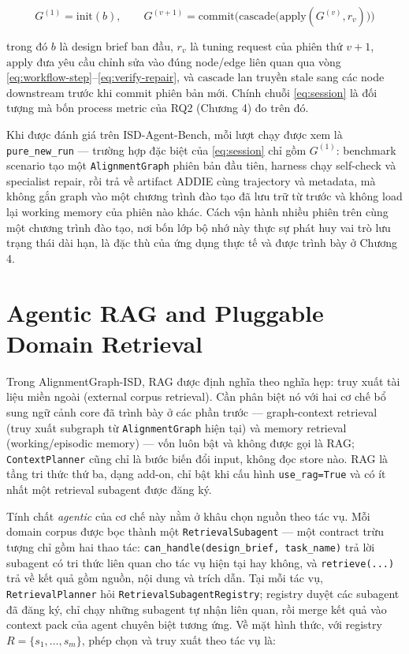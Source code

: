 \documentclass[../main.tex]{subfiles}
\begin{document}
\begin{equation}\label{eq:session}
G^{(1)} = \mathrm{init}(b), \qquad G^{(v+1)} = \mathrm{commit}\Big(\mathrm{cascade}\big(\mathrm{apply}(G^{(v)}, r_v)\big)\Big)
\end{equation}

trong đó $b$ là design brief ban đầu, $r_v$ là tuning request của phiên thứ $v{+}1$, $\mathrm{apply}$ đưa yêu cầu chỉnh sửa vào đúng node/edge liên quan qua vòng \eqref{eq:workflow-step}--\eqref{eq:verify-repair}, và $\mathrm{cascade}$ lan truyền stale sang các node downstream trước khi commit phiên bản mới. Chính chuỗi \eqref{eq:session} là đối tượng mà bốn process metric của RQ2 (Chương 4) đo trên đó.

Khi được đánh giá trên ISD-Agent-Bench, mỗi lượt chạy được xem là \texttt{pure\_new\_run} — trường hợp đặc biệt của \eqref{eq:session} chỉ gồm $G^{(1)}$: benchmark scenario tạo một \texttt{AlignmentGraph} phiên bản đầu tiên, harness chạy self-check và specialist repair, rồi trả về artifact ADDIE cùng trajectory và metadata, mà không gắn graph vào một chương trình đào tạo đã lưu trữ từ trước và không load lại working memory của phiên nào khác. Cách vận hành nhiều phiên trên cùng một chương trình đào tạo, nơi bốn lớp bộ nhớ này thực sự phát huy vai trò lưu trạng thái dài hạn, là đặc thù của ứng dụng thực tế và được trình bày ở Chương 4.

\section{Agentic RAG and Pluggable Domain Retrieval}\label{sec:agentic-rag}

Trong AlignmentGraph-ISD, RAG được định nghĩa theo nghĩa hẹp: truy xuất tài liệu miền ngoài (external corpus retrieval). Cần phân biệt nó với hai cơ chế bổ sung ngữ cảnh core đã trình bày ở các phần trước — graph-context retrieval (truy xuất subgraph từ \texttt{AlignmentGraph} hiện tại) và memory retrieval (working/episodic memory) — vốn luôn bật và không được gọi là RAG; \texttt{ContextPlanner} cũng chỉ là bước biến đổi input, không đọc store nào. RAG là tầng tri thức thứ ba, dạng add-on, chỉ bật khi cấu hình \texttt{use\_rag=True} và có ít nhất một retrieval subagent được đăng ký.

Tính chất \emph{agentic} của cơ chế này nằm ở khâu chọn nguồn theo tác vụ. Mỗi domain corpus được bọc thành một \texttt{RetrievalSubagent} — một contract trừu tượng chỉ gồm hai thao tác: \texttt{can\_handle(design\_brief, task\_name)} trả lời subagent có tri thức liên quan cho tác vụ hiện tại hay không, và \texttt{retrieve(...)} trả về kết quả gồm nguồn, nội dung và trích dẫn. Tại mỗi tác vụ, \texttt{RetrievalPlanner} hỏi \texttt{RetrievalSubagentRegistry}; registry duyệt các subagent đã đăng ký, chỉ chạy những subagent tự nhận liên quan, rồi merge kết quả vào context pack của agent chuyên biệt tương ứng. Về mặt hình thức, với registry $R = \{s_1, \dots, s_m\}$, phép chọn và truy xuất theo tác vụ là:
\end{document}

